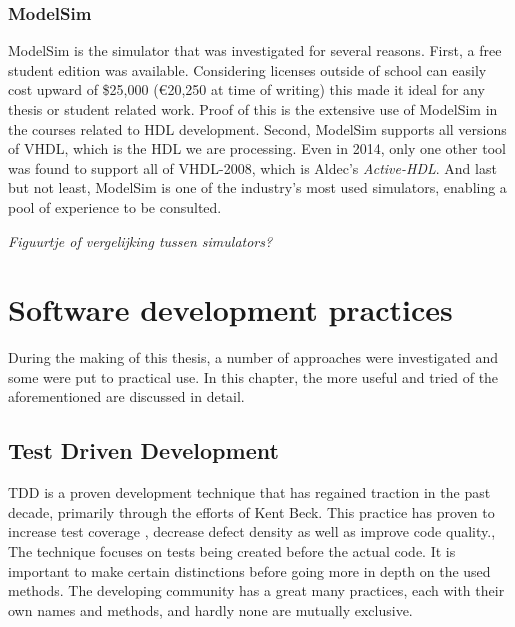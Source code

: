 \documentclass[11pt,british]{article}
\begin{document}
\label{subsec:simtool}
\subsubsection{ModelSim}
ModelSim is the simulator that was investigated for several reasons. First, a free student edition was available. Considering licenses  outside of school can easily cost upward of \$25,000 (\euro20,250 at time of writing) this made it ideal for any thesis or student related work. Proof of this is the extensive use of ModelSim in the courses related to HDL development. Second, ModelSim supports all versions of \gls{VHDL}, which is the \gls{HDL} we are processing. Even in 2014, only one other tool was found to support all of VHDL-2008, which is Aldec's \emph{Active-HDL}. And last but not least, ModelSim is one of the industry's most used simulators, enabling a pool of experience to be consulted.\cite{ModelSim}

\emph{\color{red}Figuurtje of vergelijking tussen simulators?}\\


\section{Software development practices}
During the making of this thesis, a number of approaches were investigated and some were put to practical use. In this chapter, the more useful and tried of the aforementioned are discussed in detail.


\subsection{Test Driven Development}
\gls{TDD} is a proven development technique that has regained traction in the past decade, primarily through the efforts of Kent Beck.\cite{VHDLUnit} This practice has proven to increase test coverage , decrease defect density \cite{TDDinpractice} as well as improve code quality.\cite{Siniaalto:2007:CCS:1302496.1302946},\cite{TDDinpractice,conf/isese/BhatN06} The technique focuses on tests being created before the actual code. It is important to make certain distinctions before going more in depth on the used methods. The developing community has a great many practices, each with their own names and methods, and hardly none are mutually exclusive.
\end{document}

